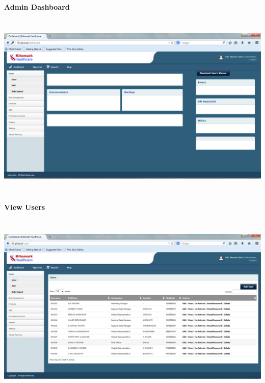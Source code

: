 
\textbf{Admin Dashboard}
\begin{center}
\includegraphics[height=9cm,width=14cm]{Admin/dashboard.png}
\end{center}
\pagebreak

\textbf{View Users}
\begin{center}
\includegraphics[height=9cm,width=14cm]{Admin/viewusers.jpg}
\end{center}



